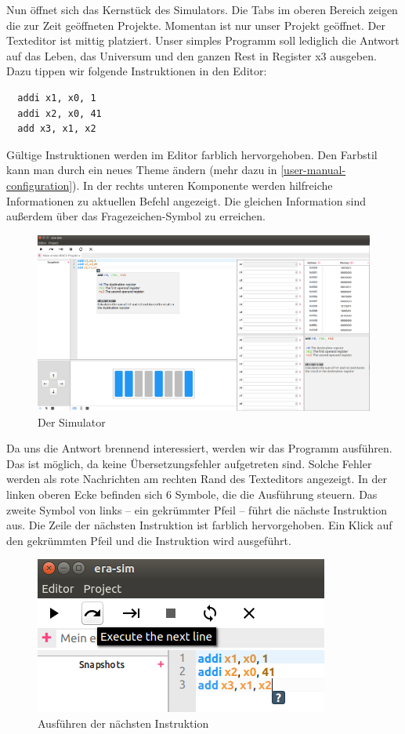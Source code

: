 Nun öffnet sich das Kernstück des Simulators. Die Tabs im oberen Bereich zeigen
die zur Zeit geöffneten Projekte. Momentan ist nur unser Projekt geöffnet. Der
Texteditor ist mittig platziert. Unser simples Programm soll lediglich die
Antwort auf das Leben, das Universum und den ganzen Rest in Register x3
ausgeben. Dazu tippen wir folgende Instruktionen in den Editor:
\begin{lstlisting}
  addi x1, x0, 1
  addi x2, x0, 41
  add x3, x1, x2
\end{lstlisting}
Gültige Instruktionen werden im Editor farblich hervorgehoben. Den Farbstil kann
man durch ein neues Theme ändern (mehr dazu in
\autoref{user-manual-configuration}). In der rechts unteren Komponente werden
hilfreiche Informationen zu aktuellen Befehl angezeigt. Die gleichen Information
sind außerdem über das Fragezeichen-Symbol zu erreichen.

\begin{figure}[H]
	\centering
	\includegraphics[scale=0.4]{Images/first-steps-2.png}
	\caption{Der Simulator}
\end{figure}

Da uns die Antwort brennend interessiert, werden wir das Programm ausführen. Das
ist möglich, da keine Übersetzungsfehler aufgetreten sind. Solche Fehler werden
als rote Nachrichten am rechten Rand des Texteditors angezeigt. In der linken
oberen Ecke befinden sich 6 Symbole, die die Ausführung steuern. Das zweite
Symbol von links -- ein gekrümmter Pfeil -- führt die nächste Instruktion aus.
Die Zeile der nächsten Instruktion ist farblich hervorgehoben. Ein Klick auf den
gekrümmten Pfeil und die Instruktion wird ausgeführt.
\begin{figure}[H]
	\centering
	\includegraphics[scale=1.0]{Images/first-steps-3.png}
	\caption{Ausführen der nächsten Instruktion}
\end{figure}

